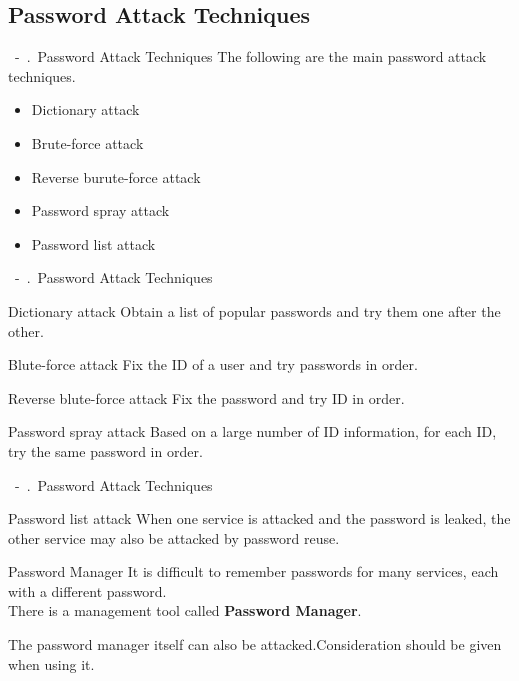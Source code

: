 \documentclass{beamer}
\newcommand{\shownum}{\thesection\ -\ \thesubsection.\ }
\begin{document}
\subsection{Password Attack Techniques}
\newcommand{\framename}{\shownum Password Attack Techniques}
\begin{frame}{\framename}
    The following are the main password attack techniques.
    \begin{block}{}
        \begin{itemize}
            \setlength{\itemsep}{0.5cm}
            \item Dictionary attack
            \item Brute-force attack
            \item Reverse burute-force attack
            \item Password spray attack
            \item Password list attack
        \end{itemize}
    \end{block}
\end{frame}
\begin{frame}{\framename}
    \begin{exampleblock}{Dictionary attack}
        Obtain a list of popular passwords and try them one after the other.
    \end{exampleblock}
    \begin{exampleblock}{Blute-force attack}
        Fix the ID of a user and try passwords in order.
    \end{exampleblock}
    \begin{exampleblock}{Reverse blute-force attack}
        Fix the password and try ID in order.
    \end{exampleblock}
    \begin{exampleblock}{Password spray attack}
        Based on a large number of ID information, for each ID, try the same password in order.
    \end{exampleblock}
\end{frame}
\begin{frame}{\framename}
    \begin{exampleblock}{Password list attack}
        When one service is attacked and the password is leaked, the other service may also be attacked by password reuse.
    \end{exampleblock}
    \begin{block}{Password Manager}
        It is difficult to remember passwords for many services, each with a different password.\\
        There is a management tool called \textbf{Password Manager}.
    \end{block}
    \begin{alertblock}{}
        The password manager itself can also be attacked.Consideration should be given when using it.
    \end{alertblock}
\end{frame}
\end{document}
